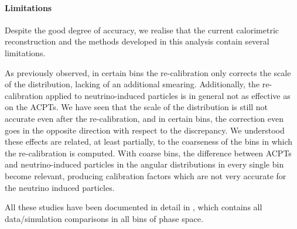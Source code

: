 \paragraph{Limitations}
Despite the good degree of accuracy, we realise that the current calorimetric reconstruction and the methods developed in this analysis contain several limitations.

As previously observed, in certain bins the re-calibration only corrects the scale of the distribution, lacking of an additional smearing.
Additionally, the re-calibration applied to neutrino-induced particles is in general not as effective as on the ACPTs.
We have seen that the scale of the distribution is still not accurate even after the re-calibration, and in certain bins, the correction even goes in the opposite direction with respect to the discrepancy.
We understood these effects are related, at least partially, to the coarseness of the bins in which the re-calibration is computed.
With coarse bins, the difference between ACPTs and neutrino-induced particles in the angular distributions in every single bin become relevant, producing calibration factors which are not very accurate for the neutrino induced particles.

All these studies have been documented in detail in \cite{bib:pid_internal_note}, which contains all data/simulation comparisons in all bins of phase space.
